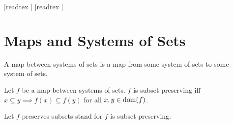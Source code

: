 \documentclass[10pt]{article}
\begin{document}
  \begin{imports}
    \begin{forthel}
      [readtex ]
      [readtex ]
    \end{forthel}
  \end{imports}


  \section*{Maps and Systems of Sets}

  \begin{forthel}
    \begin{definition}[id=FOUNDATIONS_10_1394550966845440,printid]
      A map between systems of sets is a map from some system of sets to some system of sets.
    \end{definition}
  \end{forthel}

  \begin{forthel}
    \begin{definition}[id=FOUNDATIONS_10_3290499861446656,printid]
      Let $f$ be a map between systems of sets.
      $f$ is subset preserving iff $x \subseteq y \implies f(x) \subseteq f(y)$ for all $x, y \in \operatorname{dom}(f)$.
    \end{definition}

    Let $f$ preserves subsets stand for $f$ is subset preserving.
  \end{forthel}
\end{document}
